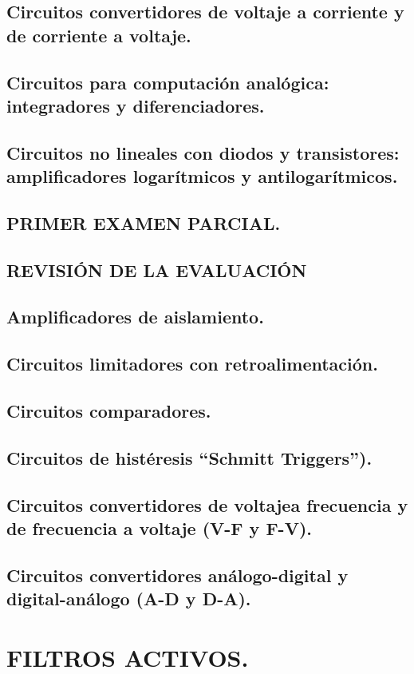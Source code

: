 \documentclass{myarticle}
\begin{document}
\subsection{Circuitos convertidores de voltaje a corriente y de corriente a voltaje.}
\subsection{Circuitos para computación analógica: integradores y diferenciadores.}
\subsection{Circuitos no lineales con diodos y transistores: amplificadores logarítmicos y antilogarítmicos.}
\subsection{\bf PRIMER EXAMEN PARCIAL.}
\subsection{\bf REVISIÓN DE LA EVALUACIÓN}
\subsection{Amplificadores de aislamiento.}
\subsection{Circuitos limitadores con retroalimentación.}
\subsection{Circuitos comparadores.}
\subsection{Circuitos de histéresis ``Schmitt Triggers'').}
\subsection{Circuitos convertidores de voltajea frecuencia y de frecuencia a voltaje (V-F y F-V).}
\subsection{Circuitos convertidores análogo-digital y digital-análogo (A-D y D-A).}
\section{ FILTROS ACTIVOS.}
\end{document}
